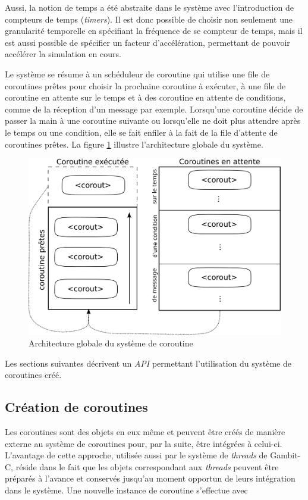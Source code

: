 \documentclass[12pt,oneside,letterpaper,francais]{book}
\begin{document}
Aussi, la notion de temps a été abstraite dans le système avec
l'introduction de compteurs de temps (\textit{timers}). Il est donc
possible de choisir non seulement une granularité temporelle en
spécifiant la fréquence de se compteur de temps, mais il est aussi
possible de spécifier un facteur d'accélération, permettant de pouvoir
accélérer la simulation en cours.

Le système se résume à un schéduleur de coroutine qui utilise une file
de coroutines prêtes pour choisir la prochaine coroutine à exécuter, à
une file de coroutine en attente sur le temps et à des coroutine en
attente de conditions, comme de la réception d'un message par
exemple. Lorsqu'une coroutine décide de passer la main à une coroutine
suivante ou lorsqu'elle ne doit plus attendre après le temps ou une
condition, elle se fait enfiler à la fait de la file d'attente de
coroutines prêtes. La figure \ref{Corout:system-schema} illustre
l'architecture globale du système.

\begin{figure}[htb!]
  \center
  \includegraphics[scale=0.7]{corout-system}
  \caption{Architecture globale du système de coroutine}
  \label{Corout:system-schema}
\end{figure}

 Les sections suivantes décrivent un \textit{API} permettant
l'utilisation du système de coroutines créé.


\subsection{Création de coroutines}
Les coroutines sont des objets en eux même et peuvent être créés de
manière externe au système de coroutines pour, par la suite, être
intégrées à celui-ci. L'avantage de cette approche, utilisée aussi par
le système de \textit{threads} de Gambit-C, réside dans le fait que
les objets correspondant aux \textit{threads} peuvent être préparés à
l'avance et conservés jusqu'au moment opportun de leurs intégration
dans le système. Une nouvelle instance de coroutine s'effectue avec
\end{document}

